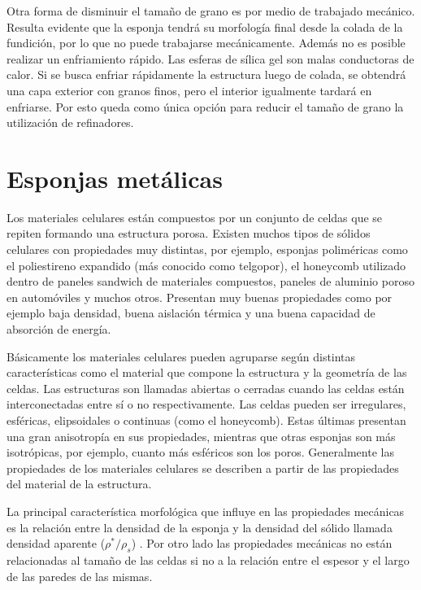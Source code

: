 \documentclass[a4paper,12pt,fleqn,twoside,openany]{book}
\begin{document}
Otra forma de disminuir el tamaño de grano es por medio de trabajado mecánico. Resulta evidente que la esponja tendrá su morfología final desde la colada de la 
fundición, por lo que no puede trabajarse mecánicamente. Además no es posible realizar un enfriamiento rápido. Las esferas de sílica gel son malas conductoras de 
calor. Si se busca enfriar rápidamente la estructura luego de colada, se obtendrá una capa exterior con granos finos, pero el interior igualmente tardará en 
enfriarse. Por esto queda como única opción para reducir el tamaño de grano la utilización de refinadores.


\section{Esponjas metálicas}

Los materiales celulares están compuestos por un conjunto de celdas que se repiten formando una estructura porosa. Existen muchos tipos de sólidos celulares 
con propiedades muy distintas, por ejemplo, esponjas poliméricas como el poliestireno expandido (más conocido como telgopor), el honeycomb utilizado dentro 
de paneles sandwich de materiales compuestos, paneles de aluminio poroso en automóviles y muchos otros. Presentan muy buenas propiedades como por ejemplo 
baja densidad, buena aislación térmica y una buena capacidad de absorción de energía.

Básicamente los materiales celulares pueden agruparse según distintas características como el material que compone la estructura y la geometría de las 
celdas. Las estructuras son llamadas abiertas o cerradas cuando las celdas están interconectadas entre sí o no respectivamente. Las celdas pueden ser irregulares, esféricas, elipsoidales o continuas (como el honeycomb). Estas últimas presentan una gran anisotropía en sus propiedades, mientras que otras 
esponjas son más isotrópicas, por ejemplo, cuanto más esféricos son los poros. Generalmente las propiedades de los materiales celulares se describen a partir de las 
propiedades del material de la estructura. 

La principal característica morfológica que influye en las propiedades mecánicas es la relación entre la densidad de la esponja y la densidad 
del sólido llamada densidad aparente ($\rho^* / \rho_s$) \cite{cellular}. Por otro lado las propiedades mecánicas no están relacionadas al tamaño 
de las celdas si no a la relación entre el espesor y el largo de las paredes de las mismas.  
\end{document}
